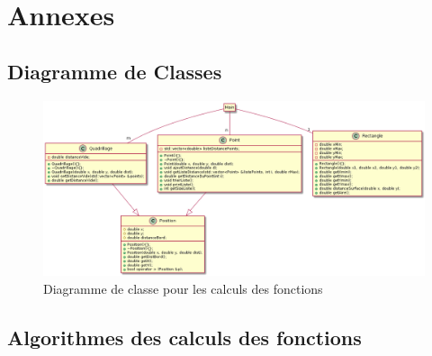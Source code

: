 \documentclass[stage2a]{tnreport}
\begin{document}
\listoffigures
\newpage


\lstlistoflistings
\newpage


\printglossaries
{}

\newpage
~
\newpage

\appendix
\part*{Annexes}
\newpage

\chapter{Diagramme de Classes}
\begin{figure}[h]
  \centering
  \includegraphics[scale=0.45]{figures/diagrammeClasses.png}
  \caption{Diagramme de classe pour les calculs des fonctions}
  \label{fig:diagClasse}
\end{figure}
\newpage


\chapter{Algorithmes des calculs des fonctions}
\end{document}
